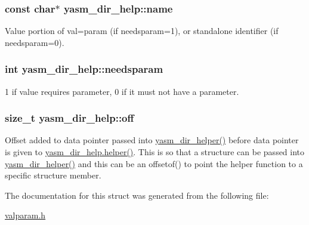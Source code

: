\hypertarget{structyasm__dir__help_a81b2e19e375fc5110e0261514907e2e7}{
\subsubsection[{name}]{\setlength{\rightskip}{0pt plus 5cm}const char$\ast$ yasm\-\_\-dir\-\_\-help\-::name}}\label{structyasm__dir__help_a81b2e19e375fc5110e0261514907e2e7}
Value portion of val=param (if needsparam=1), or standalone identifier (if needsparam=0). \hypertarget{structyasm__dir__help_abe24119f3e3e654ae6547806646eb4c6}{
\subsubsection[{needsparam}]{\setlength{\rightskip}{0pt plus 5cm}int yasm\-\_\-dir\-\_\-help\-::needsparam}}\label{structyasm__dir__help_abe24119f3e3e654ae6547806646eb4c6}
1 if value requires parameter, 0 if it must not have a parameter. \hypertarget{structyasm__dir__help_a1824c4b170376581f470e6338b6f95df}{
\subsubsection[{off}]{\setlength{\rightskip}{0pt plus 5cm}size\-\_\-t yasm\-\_\-dir\-\_\-help\-::off}}\label{structyasm__dir__help_a1824c4b170376581f470e6338b6f95df}
Offset added to data pointer passed into \hyperlink{valparam_8h_acec41779a83f94fa1b5fa5374b7d7828}{yasm\-\_\-dir\-\_\-helper()} before data pointer is given to \hyperlink{structyasm__dir__help_a3a1b8f80c538883aa9378143369653c0}{yasm\-\_\-dir\-\_\-help.\-helper()}. This is so that a structure can be passed into \hyperlink{valparam_8h_acec41779a83f94fa1b5fa5374b7d7828}{yasm\-\_\-dir\-\_\-helper()} and this can be an offsetof() to point the helper function to a specific structure member. 

The documentation for this struct was generated from the following file\-:\begin{DoxyCompactItemize}
\item 
\hyperlink{valparam_8h}{valparam.\-h}\end{DoxyCompactItemize}
